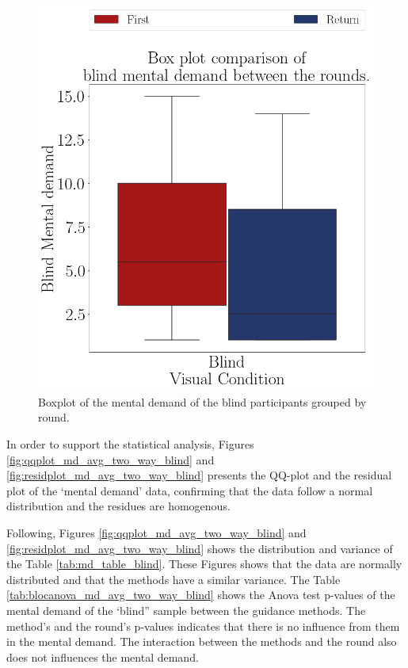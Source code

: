 \begin{figure}[!htb]
\begin{minipage}{0.45\textwidth}
        \includegraphics[width = 0.8\linewidth]{Resultados/Nasa/Figuras/png/boxplot_md_blind_rounds.png}
        \caption{Boxplot of the mental demand of the blind participants grouped by round.}
        \label{fig:boxplot_md_blind_rounds}
    \end{minipage}
\end{figure}

In order to support the statistical analysis, Figures \ref{fig:qqplot_md_avg_two_way_blind} and \ref{fig:residplot_md_avg_two_way_blind} presents the QQ-plot and the residual plot of the ‘mental demand’ data, confirming that the data follow a normal distribution and the residues are homogenous.

Following, Figures \ref{fig:qqplot_md_avg_two_way_blind} and \ref{fig:residplot_md_avg_two_way_blind} shows the distribution and variance of the Table \ref{tab:md_table_blind}. These Figures shows that the data are normally distributed and that the methods have a similar variance. The Table \ref{tab:blocanova_md_avg_two_way_blind} shows the Anova test p-values of the mental demand of the ‘blind” sample between the guidance methods. The method’s and the round’s p-values indicates that there is no influence from them in the mental demand. The interaction between the methods and the round also does not influences the mental demand.

